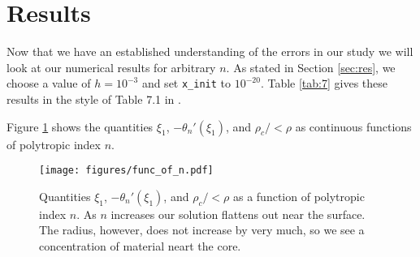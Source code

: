 \documentclass[twocolumn]{aastex631}
\begin{document}
\section{Results}
\label{sec:results}

Now that we have an established understanding of the errors in our study
we will look at our numerical results for arbitrary $n$. As stated in
Section \ref{sec:res}, we choose a value of $h=10^{-3}$ and set 
\texttt{x\_init} to $10^{-20}$. Table \ref{tab:7} gives these results
in the style of Table 7.1 in \citet{textbook}.


Figure \ref{fig:func_of_n} shows the quantities $\xi_1$, $-\theta_n'(\xi_1)$,
and $\rho_c/<\rho$ as continuous functions of polytropic index $n$.

\begin{figure}[h]
    \begin{centering}
        \texttt{[image: figures/func\_of\_n.pdf]}
        \caption{Quantities $\xi_1$, $-\theta_n'(\xi_1)$,
        and $\rho_c/<\rho$ as a function of polytropic index $n$.
        As $n$ increases our solution flattens out near the surface.
        The radius, however, does not increase by very much, so
        we see a concentration of material neart the core.}
        \label{fig:func_of_n}
    \end{centering}
\end{figure}







\end{document}
